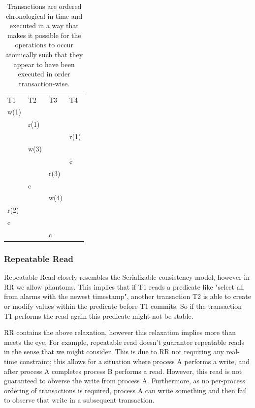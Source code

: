 \documentclass[a4paper,10pt,titlepage]{report}
\begin{document}
    \begin{table}[h]
        \begin{tabular}{l|l|l|l}
            T1   & T2   & T3   & T4   \\
            w(1) &      &      &      \\
            & r(1) &      &      \\
            &      &      & r(1) \\
            & w(3) &      &      \\
            &      &      & c    \\
            &      & r(3) &      \\
            & c    &      &      \\
            &      & w(4) &      \\
            r(2) &      &      &      \\
            c    &      &      &      \\
            &      & c    &
        \end{tabular}
        \caption{Transactions are ordered chronological in time and executed in a way that makes it possible for the operations to occur atomically such that they appear to have been executed in order transaction-wise. }
    \end{table}
    \newpage

    \subsubsection{Repeatable Read}

    Repeatable Read closely resembles the Serializable consistency model, however in RR we allow phantoms. This implies that if T1 reads a predicate like "select all from alarms with the newest timestamp", another transaction T2 is able to create or modify values within the predicate before T1 commits. So if the transaction T1 performs the read again this predicate might not be stable.

    RR contains the above relaxation, however this relaxation implies more than meets the eye. For example, repeatable read doesn't guarantee repeatable reads in the sense that we might consider. This is due to RR not requiring any real-time constraint; this allows for a situation where process A performs a write, and after process A completes process B performs a read. However, this read is not guaranteed to obverse the write from process A. Furthermore, as no per-process ordering of transactions is required, process A can write something and then fail to observe that write in a subsequent transaction.
\end{document}
